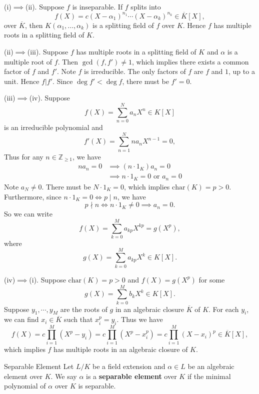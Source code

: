 \begin{prf}
    (i)$\implies$(ii). Suppose $f$ is inseparable. If $f$ splits into
    \[
    f(X)=c(X-\alpha_1)^{n_1}\cdots(X-\alpha_k)^{n_k}\in \overline{K}[X],
    \]
    over $\overline{K}$, then $K(\alpha_1,\ldots,\alpha_k)$ is a splitting field of $f$ over $K$. Hence $f$ has multiple roots in a splitting field of $K$.

    (ii)$\implies$(iii). Suppose $f$ has multiple roots in a splitting field of $K$ and $\alpha$ is a multiple root of $f$. Then $\gcd (f,f')\ne 1$, which implies there exists a common factor of $f$ and $f'$. Note $f$ is irreducible. The only factors of $f$ are $f$ and $1$, up to a unit. Hence $f|f'$. Since $\deg f'<\deg f$, there must be $f'=0$.

    (iii)$\implies$(iv). Suppose 
    \[
        f(X)=\sum_{n=0}^N a_n X^n\in K[X]
    \]
    is an irreducible polynomial and 
    \[
        f'(X)=\sum_{n=1}^N na_n X^{n-1}=0,
    \]
    Thus for any $n\in \mathbb{Z}_{\ge 1}$, we have
    \begin{align*}
        na_n=0&\implies\left(n\cdot 1_K\right)a_n=0\\
        &\implies n\cdot 1_K=0\text{ or }a_n=0
    \end{align*}
    Note $a_N\ne 0$. There must be $N\cdot 1_K=0$, which implies $\mathrm{char}(K)=p>0$. Furthermore, since $n\cdot 1_K=0\iff p\mid n$, we have
    \[
    p \nmid n\iff n\cdot 1_K\ne 0 \implies a_n=0.
    \]
    So we can write
    \[
    f(X)=\sum_{k=0}^M a_{kp}X^{kp}=g(X^p),
    \]
    where 
    \[
    g(X)=\sum_{k=0}^M a_{kp}X^k\in K[X].
    \]

    (iv)$\implies$(i). Suppose $\mathrm{char}(K)=p>0$ and $f(X)=g(X^p)$ for some 
    \[
    g(X)=\sum_{k=0}^M b_kX^k\in K[X].
    \]
    Suppose $y_1,\cdots, y_M$ are the roots of $g$ in an algebraic closure $\overline{K}$ of $K$. For each $y_i$, we can find $x_i\in \overline{K}$ such that $x_i^p=y_i$. Thus we have
    \[
    f(X)=c\prod_{i=1}^M(X^p-y_i)=c\prod_{i=1}^M(X^p-x_i^p)=c\prod_{i=1}^M(X-x_i)^p\in \overline{K}[X],
    \]
    which implies $f$ has multiple roots in an algebraic closure of $K$.
\end{prf}

\begin{definition}{Separable Element}{}
    Let $L/K$ be a field extension and $\alpha\in L$ be an algebraic element over $K$. We say $\alpha$ is a \textbf{separable element} over $K$ if the minimal polynomial of $\alpha$ over $K$ is separable. 
\end{definition}

